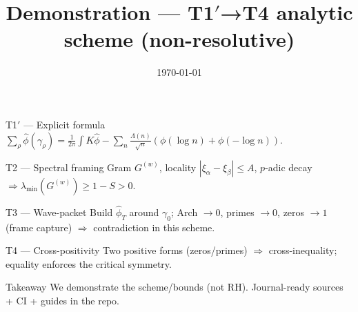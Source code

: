 \documentclass[aspectratio=169]{beamer}
\title{\texorpdfstring{Demonstration — T1$′$→T4 analytic scheme (non-resolutive)}{Demonstration — T1′→T4 analytic scheme (non-resolutive)}}
\author{\InterIAPDFAuthors}
\date{\today}
\begin{document}


\begin{frame}\titlepage\end{frame}
\begin{frame}{T1$′$ — Explicit formula}
\small $\displaystyle \sum_\rho \widehat\phi(\gamma_\rho)=\frac{1}{2\pi}\int K\widehat\phi-\sum_n \frac{\Lambda(n)}{\sqrt n}(\phi(\log n)+\phi(-\log n))$.
\end{frame}
\begin{frame}{T2 — Spectral framing}
\small Gram $G^{(w)}$, locality $|\xi_\alpha-\xi_\beta|\le A$, $p$-adic decay $\Rightarrow \lambda_{\min}(G^{(w)})\ge 1-S>0$.
\end{frame}
\begin{frame}{T3 — Wave-packet}
\small Build $\widehat\phi_T$ around $\gamma_0$; Arch $\to 0$, primes $\to 0$, zeros $\to 1$ (frame capture) $\Rightarrow$ contradiction in this scheme.
\end{frame}
\begin{frame}{T4 — Cross-positivity}
\small Two positive forms (zeros/primes) $\Rightarrow$ cross-inequality; equality enforces the critical symmetry.
\end{frame}
\begin{frame}{Takeaway}
\small We demonstrate the scheme/bounds (not RH). Journal-ready sources + CI + guides in the repo.
\end{frame}
\end{document}
